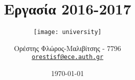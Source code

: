 

\subject{Συστήματα Πολυμέσων και Εικονική Πραγματικότητα}
\title{Εργασία 2016-2017}
\subtitle{\centering\texttt{[image: university]}}
\author{
    Ορέστης Φλώρος-Μαλιβίτσης - 7796\\ \texttt{\href{mailto:orestisf@ece.auth.gr}{orestisf@ece.auth.gr}}
}
\date{\today}


\maketitle
{}
\tableofcontents
\setcounter{page}{1}

\setcounter{section}{-1}





